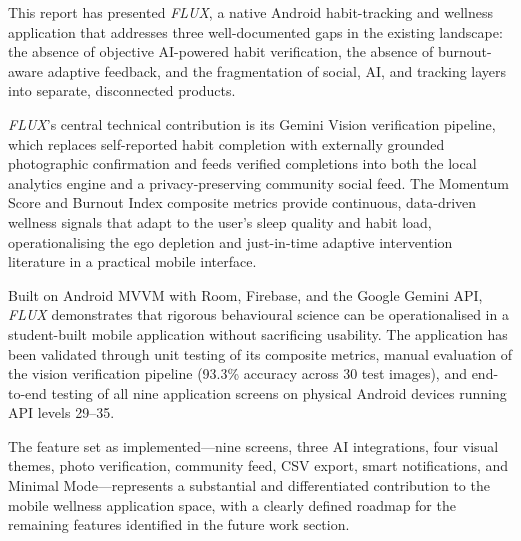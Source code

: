 \documentclass[12pt,a4paper]{article}
\newcommand{\FL}{\textit{FLUX}}
\begin{document}
This report has presented \FL{}, a native Android habit-tracking and wellness
application that addresses three well-documented gaps in the existing landscape:
the absence of objective AI-powered habit verification, the absence of
burnout-aware adaptive feedback, and the fragmentation of social, AI, and tracking
layers into separate, disconnected products.

\FL{}'s central technical contribution is its Gemini Vision verification pipeline,
which replaces self-reported habit completion with externally grounded photographic
confirmation and feeds verified completions into both the local analytics engine and
a privacy-preserving community social feed. The Momentum Score and Burnout Index
composite metrics provide continuous, data-driven wellness signals that adapt to
the user's sleep quality and habit load, operationalising the ego depletion and
just-in-time adaptive intervention literature in a practical mobile interface.

Built on Android MVVM with Room, Firebase, and the Google Gemini API,
\FL{} demonstrates that rigorous behavioural science can be operationalised in a
student-built mobile application without sacrificing usability. The application
has been validated through unit testing of its composite metrics, manual evaluation
of the vision verification pipeline (93.3\% accuracy across 30 test images), and
end-to-end testing of all nine application screens on physical Android devices
running API levels 29--35.

The feature set as implemented---nine screens, three AI integrations, four visual
themes, photo verification, community feed, CSV export, smart notifications, and
Minimal Mode---represents a substantial and differentiated contribution to the
mobile wellness application space, with a clearly defined roadmap for the remaining
features identified in the future work section.
\end{document}
